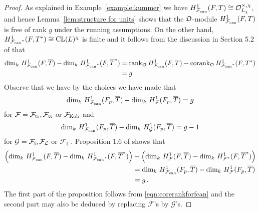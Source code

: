 \documentclass[12pt]{amsart}
\numberwithin{equation}{section}
\begin{document}
\begin{proof}
As explained in Example~\ref{example:kummer} we have  $H^1_{\mathcal{F}_{\textup{\lowercase{can}}}}(F,T)\cong {\mathcal{O}}_{L_\chi}^{\times,\chi}$, and hence Lemma~\ref{lem:structure for units} shows that the ${\frak{O}}$-module $H^1_{\mathcal{F}_{\textup{\lowercase{can}}}}(F,T)$ is free of rank $g$ under the running assumptions. On the other hand, $H^1_{{\mathcal{F}_{\textup{\lowercase{can}}}}^*}(F,T^*)\cong \textup{CL}(L)^\chi$ is finite and it follows from the discussion in Section 5.2 of \cite{mr02} that 
\begin{align}\label{eqn:corerankforfcan}
\notag\dim_{k}\, H^1_{\mathcal{F}_{\textup{\lowercase{can}}}}(F,\overline{T})-\dim_{k}\, H^1_{{\mathcal{F}_{\textup{\lowercase{can}}}}^*}(F,\overline{T}^*)&=\textup{rank}_{\frak{O}}\, H^1_{\mathcal{F}_{\textup{\lowercase{can}}}}(F,T)-\textup{corank}_{\frak{O}}\, H^1_{{\mathcal{F}_{\textup{\lowercase{can}}}}^*}(F,{T}^*)\\
&=g
\end{align}
Observe that we have by the choices we have made that 
$$\dim_k\, H^1_{\mathcal{F}_{\textup{\lowercase{can}}}}(F_p,\overline{T}) -\dim_k\,H^1_{\mathcal{F}}(F_p,\overline{T})=g$$
for ${\mathcal{F}}={\mathcal{F}}_\textup{tr},{\mathcal{F}}_\frak{tr}$ or ${\mathcal{F}}_\textup{Kob}$ and  
$$\dim_k\, H^1_{\mathcal{F}_{\textup{\lowercase{can}}}}(F_p,\overline{T}) -\dim_k\,H^1_{\mathcal{G}}(F_p,\overline{T})=g-1$$
for $\mathcal{G}={\mathcal{F}}_\frak{l}, {\mathcal{F}}_\mathcal{L}$ or ${\mathcal{F}}_\mathbb{L}$\,. Proposition 1.6 of \cite{wiles} shows that
\begin{align*}
\left(\dim_{k}\, H^1_{\mathcal{F}_{\textup{\lowercase{can}}}}(F,\overline{T})-\dim_{k}\, H^1_{{\mathcal{F}_{\textup{\lowercase{can}}}}^*}(F,\overline{T}^*)\right)&-\left(\dim_k\, H^1_{\mathcal{F}}(F,\overline{T})-\dim_k\, H^1_{{\mathcal{F}}^*}(F,\overline{T}^*)\right)\\
&=\dim_k\, H^1_{\mathcal{F}_{\textup{\lowercase{can}}}}(F_p,\overline{T}) -\dim_k\,H^1_{\mathcal{F}}(F_p,\overline{T})\\
&=g\,.
\end{align*}
The first part of the proposition follows from \eqref{eqn:corerankforfcan} and the second part may also be deduced by replacing ${\mathcal{F}}$'s by $\mathcal{G}$'s.
\end{proof}
\end{document}
